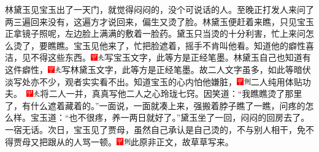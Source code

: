 林黛玉见宝玉出了一天门，就觉得闷闷的，没个可说话的人。至晚正打发人来问了两三遍回来没有，这遍方才说回来，偏生又烫了脸。林黛玉便赶着来瞧，只见宝玉正拿镜子照呢，左边脸上满满的敷着一脸药。黛玉只当烫的十分利害，忙上来问怎么烫了，要瞧瞧。宝玉见他来了，忙把脸遮着，摇手不肯叫他看。知道他的癖性喜洁，见不得这些东西。{\includegraphics[width=3mm]{../Images/00002}\includegraphics[width=3mm]{../Images/00012}\footnotesize \kaishu 写宝玉文字，此等方是正经笔墨。}林黛玉自己也知道有这件癖性，{\includegraphics[width=3mm]{../Images/00002}\includegraphics[width=3mm]{../Images/00012}\footnotesize \kaishu 写林黛玉文字，此等方是正经笔墨。故二人文字虽多，如此等暗伏淡写处亦不少，观者实实看不出。}知道宝玉的心内怕他嫌脏，{\includegraphics[width=3mm]{../Images/00002}\includegraphics[width=3mm]{../Images/00011}\footnotesize \kaishu 二人纯用体贴功夫。　\includegraphics[width=3mm]{../Images/00002}\includegraphics[width=3mm]{../Images/00012}\footnotesize \kaishu 将二人一并，真真写他二人之心玲珑七窍。}因笑道：``我瞧瞧烫了那里了，有什么遮着藏着的。''一面说，一面就凑上来，强搬着脖子瞧了一瞧，问疼的怎么样。宝玉道：``也不很疼，养一两日就好了。''黛玉坐了一回，闷闷的回房去了。一宿无话。次日，宝玉见了贾母，虽然自己承认是自己烫的，不与别人相干，免不得贾母又把跟从的人骂一顿。{\includegraphics[width=3mm]{../Images/00002}\includegraphics[width=3mm]{../Images/00011}\footnotesize \kaishu 此原非正文，故草草写来。}

